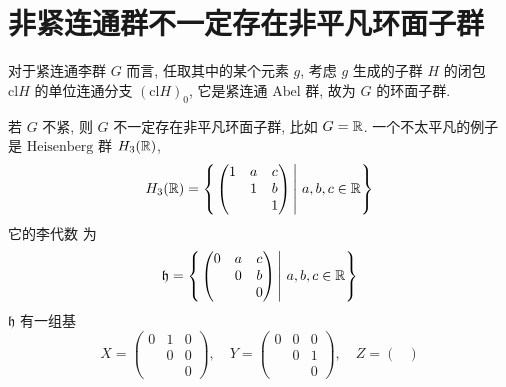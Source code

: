     \section{非紧连通\Lie 群不一定存在非平凡环面子群}
        \begin{example}
            对于紧连通李群 $G$ 而言, 任取其中的某个元素 $g$, 考虑 $g$ 生成的子群 $H$ 的闭包 $\mathrm{cl}H$ 的单位连通分支 $(\mathrm{cl}H)_0$, 
            它是紧连通 $\mathrm{Abel}$ 群, 故为 $G$ 的环面子群.
            
            若 $G$ 不紧, 则 $G$ 不一定存在非平凡环面子群, 比如 $G=\mathbb{R}$. 
            一个不太平凡的例子是 $\mathrm{Heisenberg}$ 群 $H_3(\mathbb{R})$, 
            \begin{equation*}
                H_3(\mathbb{R}) = \left\{\left.
                \begin{pmatrix}
                    1 & a & c \\
                      & 1 & b \\
                      &   & 1
                \end{pmatrix}\,\right|\,a,b,c\in\mathbb{R}\right\}
            \end{equation*}
            它的李代数  为
            \begin{equation*}
                \mathfrak{h} = \left\{\left.
                \begin{pmatrix}
                    0 & a & c \\
                      & 0 & b \\
                      &   & 0
                \end{pmatrix}\,\right|\,a,b,c\in\mathbb{R}\right\}
            \end{equation*}
            $\mathfrak{h}$ 有一组基
            \begin{equation*}
                X = \begin{pmatrix}
                    0 & 1 & 0 \\
                      & 0 & 0 \\
                      &   & 0
                \end{pmatrix},\quad
                Y = \begin{pmatrix}
                    0 & 0 & 0 \\
                      & 0 & 1 \\
                      &   & 0
                \end{pmatrix},\quad
                Z = \begin{pmatrix}

\end{pmatrix}
\end{equation*}
\end{example}
